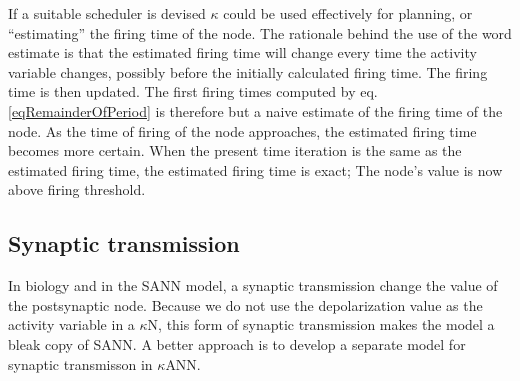 	
	If a suitable scheduler is devised $\kappa$ could be used effectively for planning, or ``estimating'' the firing time of the node.
	The rationale behind the use of the word estimate is that the estimated firing time will change every time the activity variable changes, possibly before the initially calculated firing time. 
	The firing time is then updated. 
	The first firing times computed by eq. \eqref{eqRemainderOfPeriod} is therefore but a naive estimate of the firing time of the node.
	As the time of firing of the node approaches, the estimated firing time becomes more certain.
	When the present time iteration is the same as the estimated firing time, the estimated firing time is exact; The node's value is now above firing threshold.
	


	
	\subsection{Synaptic transmission}

		In biology and in the SANN model, a synaptic transmission change the value of the postsynaptic node.
		Because we do not use the depolarization value as the activity variable in a $\kappa$N, this form of synaptic transmission makes the model a bleak copy of SANN.   %
		A better approach is to develop a separate model for synaptic transmisson in $\kappa$ANN.

